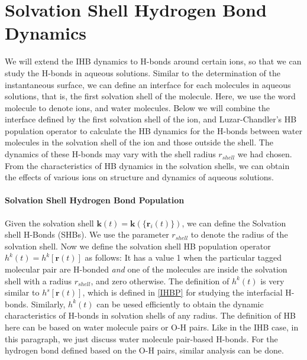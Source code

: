 \FloatBarrier
\section{Solvation Shell Hydrogen Bond Dynamics} \label{SHB_dynamics}
We will extend the IHB dynamics to H-bonds around certain ions, so that we can study the H-bonds in aqueous solutions. 
Similar to the determination of the instantaneous surface, we can define an interface for each molecules in aqueous solutions, that is, 
the first solvation shell of the molecule. Here, we use the word molecule to denote ions, and water molecules.  
Below we will combine the interface defined by the first solvation shell of the ion, 
and Luzar-Chandler's HB population operator \cite{AL96} to calculate the HB
dynamics for the H-bonds between water molecules in the solvation shell of the ion and those outside the shell. 
The dynamics of these H-bonds may vary with the shell radius $r_{shell}$ we had chosen.
From the characteristics of HB dynamics in the solvation shells, we can obtain the effects of various ions on structure and dynamics of aqueous solutions. 

\paragraph{Solvation Shell Hydrogen Bond Population}
Given the solvation shell ${\mathbf k}(t)={\mathbf k}(\{{\mathbf r}_i(t)\})$, we can define the Solvation shell H-Bonds (SHBs).
We use the parameter $r_{shell}$ to denote the radius of the solvation shell.
Now we define the solvation shell HB population operator $h^{k}(t) = h^{k}[{\mathbf r}(t)]$ as follows:
It has a value 1 when the particular tagged molecular pair are H-bonded \emph{and} one of the molecules are inside the solvation shell
with a radius $r_{shell}$, and zero otherwise. 
The definition of $h^{k}(t)$ is very similar to $h^{s}[{\mathbf r}(t)]$, which is defined in \ref{IHBP} for studying the interfacial H-bonds.
Similarly, $h^{k}(t)$ can be uesed efficiently to obtain the dynamic characteristics of H-bonds in solvation shells of any radius. 
The definition of HB here can be based on water molecule pairs or O-H pairs. 
Like in the IHB case, in this paragraph, we just discuss water molecule pair-based H-bonds. 
For the hydrogen bond defined based on the O-H pairs, similar analysis can be done.

